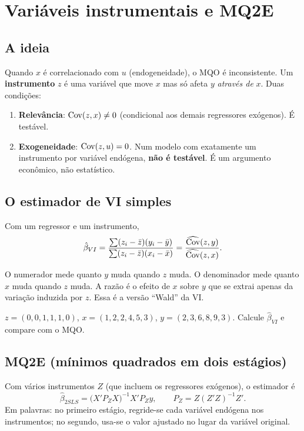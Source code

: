 \chapter{Variáveis instrumentais e MQ2E}
\label{cap:vi}

\section{A ideia}
Quando $x$ é correlacionado com $u$ (endogeneidade), o MQO é inconsistente. Um \textbf{instrumento} $z$ é uma variável que move $x$ mas só afeta $y$ \emph{através de} $x$. Duas condições:
\begin{enumerate}[leftmargin=1.6em]
\item \textbf{Relevância}: $\operatorname{Cov}(z,x)\ne0$ (condicional aos demais regressores exógenos). É testável.
\item \textbf{Exogeneidade}: $\operatorname{Cov}(z,u)=0$. Num modelo com exatamente um instrumento por variável endógena, \textbf{não é testável}. É um argumento econômico, não estatístico.
\end{enumerate}

\section{O estimador de VI simples}
Com um regressor e um instrumento,
\[
\hat\beta_{VI}=\frac{\sum(z_i-\bar z)(y_i-\bar y)}{\sum(z_i-\bar z)(x_i-\bar x)}=\frac{\widehat{\operatorname{Cov}}(z,y)}{\widehat{\operatorname{Cov}}(z,x)}.
\]
\begin{intuicao}
O numerador mede quanto $y$ muda quando $z$ muda. O denominador mede quanto $x$ muda quando $z$ muda. A razão é o efeito de $x$ sobre $y$ que se extrai apenas da variação induzida por $z$. Essa é a versão ``Wald'' da VI.
\end{intuicao}

\begin{exercicio}
$z=(0,0,1,1,1,0)$, $x=(1,2,2,4,5,3)$, $y=(2,3,6,8,9,3)$. Calcule $\hat\beta_{VI}$ e compare com o MQO.
\end{exercicio}

\section{MQ2E (mínimos quadrados em dois estágios)}
Com vários instrumentos $Z$ (que incluem os regressores exógenos), o estimador é
\[
\hat\beta_{2SLS}=\big(X'P_ZX\big)^{-1}X'P_Zy,\qquad P_Z=Z(Z'Z)^{-1}Z'.
\]
Em palavras: no primeiro estágio, regride-se cada variável endógena nos instrumentos; no segundo, usa-se o valor ajustado no lugar da variável original.

